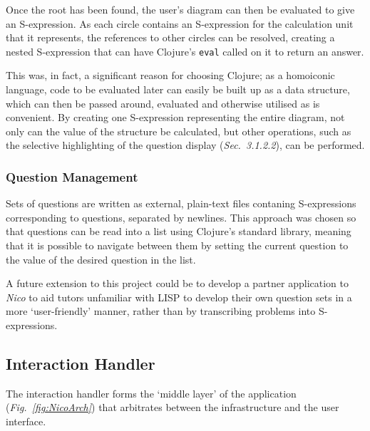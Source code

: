 \documentclass[12pt,twoside,notitlepage,xetex]{report}
\begin{document}
{Once the root has been found, the user's diagram can then be evaluated to give an S-expression.  As each circle contains an S-expression for the calculation unit that it represents, the references to other circles can be resolved, creating a nested S-expression that can have Clojure's \verb¬eval¬ called on it to return an answer.

This was, in fact, a significant reason for choosing Clojure; as a homoiconic language, code to be evaluated later can easily be built up as a data structure, which can then be passed around, evaluated and otherwise utilised as is convenient.  By creating one S-expression representing the entire diagram, not only can the value of the structure be calculated, but other operations, such as the selective highlighting of the question display (\emph{Sec.~3.1.2.2}), can be performed.

\subsubsection{Question Management}

Sets of questions are written as external, plain-text files contaning S-expressions corresponding to questions, separated by newlines.  This approach was chosen so that questions can be read into a list using Clojure's standard library, meaning that it is possible to navigate between them by setting the current question to the value of the desired question in the list.

A future extension to this project could be to develop a partner application to \emph{Nico} to aid tutors unfamiliar with LISP to develop their own question sets in a more `user-friendly' manner, rather than by transcribing problems into S-expressions.

\subsection{Interaction Handler}
%

The interaction handler forms the `middle layer' of the application (\emph{Fig.~\ref{fig:NicoArch}}) that arbitrates between the infrastructure and the user interface.

}
\end{document}
